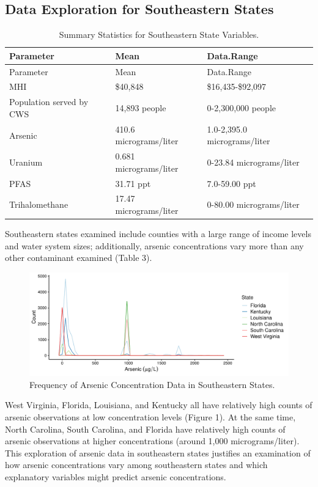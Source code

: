 \documentclass[12pt,]{article}
\begin{document}
\hypertarget{data-exploration-for-southeastern-states}{%
\subsection{Data Exploration for Southeastern
States}\label{data-exploration-for-southeastern-states}}

\begin{longtable}[]{@{}lll@{}}
\caption{Summary Statistics for Southeastern State
Variables.}\tabularnewline
\toprule
Parameter & Mean & Data.Range\tabularnewline
\midrule
\endfirsthead
\toprule
Parameter & Mean & Data.Range\tabularnewline
\midrule
\endhead
MHI & \$40,848 & \$16,435-\$92,097\tabularnewline
Population served by CWS & 14,893 people & 0-2,300,000
people\tabularnewline
Arsenic & 410.6 micrograms/liter & 1.0-2,395.0
micrograms/liter\tabularnewline
Uranium & 0.681 micrograms/liter & 0-23.84
micrograms/liter\tabularnewline
PFAS & 31.71 ppt & 7.0-59.00 ppt\tabularnewline
Trihalomethane & 17.47 micrograms/liter & 0-80.00
micrograms/liter\tabularnewline
\bottomrule
\end{longtable}

\begin{quote}
\end{quote}

Southeastern states examined include counties with a large range of
income levels and water system sizes; additionally, arsenic
concentrations vary more than any other contaminant examined (Table 3).

\begin{figure}
\centering
\includegraphics{Project_Template_files/figure-latex/figs-1.pdf}
\caption{Frequency of Arsenic Concentration Data in Southeastern
States.}
\end{figure}

West Virginia, Florida, Louisiana, and Kentucky all have relatively high
counts of arsenic observations at low concentration levels (Figure 1).
At the same time, North Carolina, South Carolina, and Florida have
relatively high counts of arsenic observations at higher concentrations
(around 1,000 micrograms/liter). This exploration of arsenic data in
southeastern states justifies an examination of how arsenic
concentrations vary among southeastern states and which explanatory
variables might predict arsenic concentrations.
\end{document}
